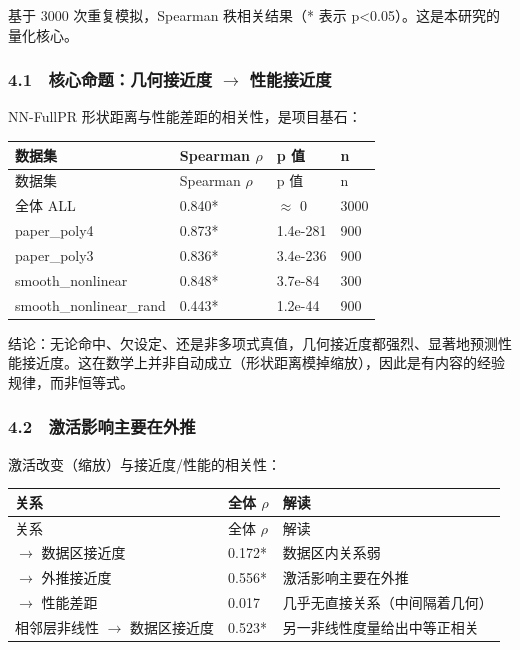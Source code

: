 \documentclass[UTF8,a4paper,11pt]{ctexart}
\begin{document}
基于 3000 次重复模拟，Spearman 秩相关结果（* 表示 p<0.05）。这是本研究的量化核心。

\subsubsection{4.1　核心命题：几何接近度 $\to$ 性能接近度}

NN-FullPR 形状距离与性能差距的相关性，是项目基石：

\begin{longtable}{p{}p{}p{}p{}}
\toprule
数据集 & Spearman $\rho$ & p 值 & n \\
\midrule
\endfirsthead
\toprule
数据集 & Spearman $\rho$ & p 值 & n \\
\midrule
\endhead
全体 ALL & 0.840* & $\approx$ 0 & 3000 \\
paper\_poly4 & 0.873* & 1.4e-281 & 900 \\
paper\_poly3 & 0.836* & 3.4e-236 & 900 \\
smooth\_nonlinear & 0.848* & 3.7e-84 & 300 \\
smooth\_nonlinear\_rand & 0.443* & 1.2e-44 & 900 \\
\bottomrule
\end{longtable}

结论：无论命中、欠设定、还是非多项式真值，几何接近度都强烈、显著地预测性能接近度。这在数学上并非自动成立（形状距离模掉缩放），因此是有内容的经验规律，而非恒等式。

\subsubsection{4.2　激活影响主要在外推}

激活改变（缩放）与接近度/性能的相关性：

\begin{longtable}{p{}p{}p{}}
\toprule
关系 & 全体 $\rho$ & 解读 \\
\midrule
\endfirsthead
\toprule
关系 & 全体 $\rho$ & 解读 \\
\midrule
\endhead
$\to$ 数据区接近度 & 0.172* & 数据区内关系弱 \\
$\to$ 外推接近度 & 0.556* & 激活影响主要在外推 \\
$\to$ 性能差距 & 0.017 & 几乎无直接关系（中间隔着几何） \\
相邻层非线性 $\to$ 数据区接近度 & 0.523* & 另一非线性度量给出中等正相关 \\
\bottomrule
\end{longtable}
\end{document}
